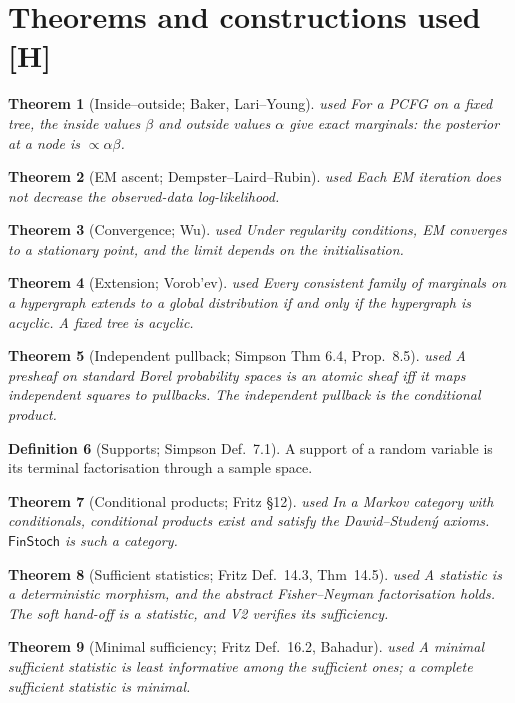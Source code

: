 \documentclass[11pt]{article}
\newtheorem{theorem}{Theorem}[section]
\theoremstyle{definition}
\newtheorem{definition}[theorem]{Definition}
\theoremstyle{remark}
\newcommand{\src}[1]{\textsf{\small[#1]}}
\newcommand{\st}[1]{\textsf{\small\color{gray}#1}}
\begin{document}
\section{Theorems and constructions used \src{H}}
\begin{theorem}[Inside--outside; Baker, Lari--Young]\label{thm:io}\st{used}
For a PCFG on a fixed tree, the inside values $\beta$ and outside values $\alpha$ give exact marginals: the posterior at a node is $\propto\alpha\beta$.
\end{theorem}
\begin{theorem}[EM ascent; Dempster--Laird--Rubin]\label{thm:em}\st{used}
Each EM iteration does not decrease the observed-data log-likelihood.
\end{theorem}
\begin{theorem}[Convergence; Wu]\st{used}
Under regularity conditions, EM converges to a stationary point, and the limit depends on the initialisation.
\end{theorem}
\begin{theorem}[Extension; Vorob'ev]\label{thm:vorobev}\st{used}
Every consistent family of marginals on a hypergraph extends to a global distribution if and only if the hypergraph is acyclic. A fixed tree is acyclic.
\end{theorem}
\begin{theorem}[Independent pullback; Simpson Thm 6.4, Prop.~8.5]\st{used}
A presheaf on standard Borel probability spaces is an atomic sheaf iff it maps independent squares to pullbacks. The independent pullback is the conditional product.
\end{theorem}
\begin{definition}[Supports; Simpson Def.~7.1] A support of a random variable is its terminal factorisation through a sample space.\end{definition}
\begin{theorem}[Conditional products; Fritz \S12]\st{used}
In a Markov category with conditionals, conditional products exist and satisfy the Dawid--Studen\'y axioms. $\mathsf{FinStoch}$ is such a category.
\end{theorem}
\begin{theorem}[Sufficient statistics; Fritz Def.~14.3, Thm~14.5]\st{used}
A statistic is a deterministic morphism, and the abstract Fisher--Neyman factorisation holds. The soft hand-off is a statistic, and V2 verifies its sufficiency.
\end{theorem}
\begin{theorem}[Minimal sufficiency; Fritz Def.~16.2, Bahadur]\st{used}
A minimal sufficient statistic is least informative among the sufficient ones; a complete sufficient statistic is minimal.
\end{theorem}
\end{document}
